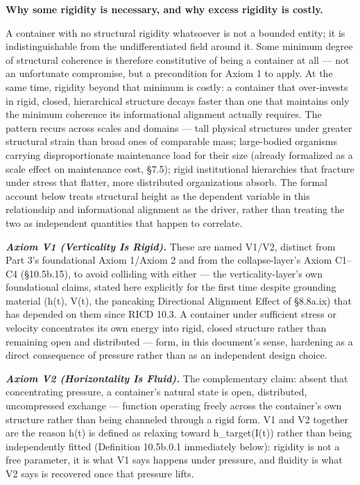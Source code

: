 \documentclass[
]{article}
\begin{document}
\textbf{Why some rigidity is necessary, and why excess rigidity is
costly.}

A container with no structural rigidity whatsoever is not a bounded
entity; it is indistinguishable from the undifferentiated field around
it. Some minimum degree of structural coherence is therefore
constitutive of being a container at all --- not an unfortunate
compromise, but a precondition for Axiom 1 to apply. At the same time,
rigidity beyond that minimum is costly: a container that over-invests in
rigid, closed, hierarchical structure decays faster than one that
maintains only the minimum coherence its informational alignment
actually requires. The pattern recurs across scales and domains --- tall
physical structures under greater structural strain than broad ones of
comparable mass; large-bodied organisms carrying disproportionate
maintenance load for their size (already formalized as a scale effect on
maintenance cost, §7.5); rigid institutional hierarchies that fracture
under stress that flatter, more distributed organizations absorb. The
formal account below treats structural height as the dependent variable
in this relationship and informational alignment as the driver, rather
than treating the two as independent quantities that happen to
correlate.

\emph{\textbf{Axiom V1 (Verticality Is Rigid).}} These are named V1/V2,
distinct from Part 3's foundational Axiom 1/Axiom 2 and from the
collapse-layer's Axiom C1--C4 (§10.5b.15), to avoid colliding with
either --- the verticality-layer's own foundational claims, stated here
explicitly for the first time despite grounding material (h(t), V(t),
the pancaking Directional Alignment Effect of §8.8a.ix) that has
depended on them since RICD 10.3. A container under sufficient stress or
velocity concentrates its own energy into rigid, closed structure rather
than remaining open and distributed --- form, in this document's sense,
hardening as a direct consequence of pressure rather than as an
independent design choice.

\emph{\textbf{Axiom V2 (Horizontality Is Fluid).}} The complementary
claim: absent that concentrating pressure, a container's natural state
is open, distributed, uncompressed exchange --- function operating
freely across the container's own structure rather than being channeled
through a rigid form. V1 and V2 together are the reason h(t) is defined
as relaxing toward h\_target(I(t)) rather than being independently
fitted (Definition 10.5b.0.1 immediately below): rigidity is not a free
parameter, it is what V1 says happens under pressure, and fluidity is
what V2 says is recovered once that pressure lifts.
\end{document}
